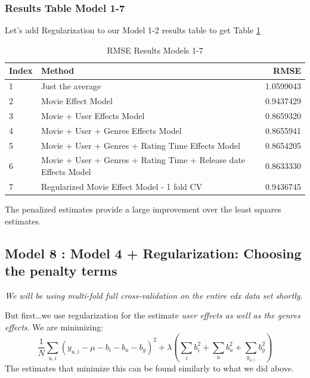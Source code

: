 \documentclass[
]{article}
\begin{document}
\newpage

\hypertarget{results-table-model-1-7}{%
\subsubsection{Results Table Model 1-7}\label{results-table-model-1-7}}

Let's add Regularization to our Model 1-2 results table to get Table
\ref{tbl:rmse_results_model_1-7}

\begin{table}[H]

\caption{\label{tab:e_u_pls_5}RMSE Results Models 1-7\label{tbl:rmse_results_model_1-7}}
\centering
\fontsize{7}{9}\selectfont
\begin{tabular}[t]{llr}
\toprule
Index & Method & RMSE\\
\midrule
1 & Just the average & 1.0599043\\
2 & Movie Effect Model & 0.9437429\\
3 & Movie + User Effects Model & 0.8659320\\
4 & Movie + User + Genres Effects Model & 0.8655941\\
5 & Movie + User + Genres + Rating Time Effects Model & 0.8654205\\
6 & Movie + User + Genres + Rating Time + Release date Effects Model & 0.8633330\\
7 & Regularized Movie Effect Model - 1 fold CV & 0.9436745\\
\bottomrule
\end{tabular}
\end{table}

The penalized estimates provide a large improvement over the least
squares estimates.

\newpage

\hypertarget{model-8-model-4-regularization-choosing-the-penalty-terms}{%
\subsection{Model 8 : Model 4 + Regularization: Choosing the penalty
terms}\label{model-8-model-4-regularization-choosing-the-penalty-terms}}

\emph{We will be using multi-fold full cross-validation on the entire
edx data set shortly}.

But first\ldots we use regularization for the estimate \emph{user
effects as well as the genres effects}. We are minimizing:\\
\[\frac{1}{N}\sum_{u,i}(y_{u,i}-\mu-b_{i}-b_{u}-b_{g})^2+\lambda(\sum_{i}{b_{i}^2}+\sum_{u}{b_{u}^2}+\sum_{g_{u,i}}{b_{g}^2})\]
The estimates that minimize this can be found similarly to what we did
above.
\end{document}
